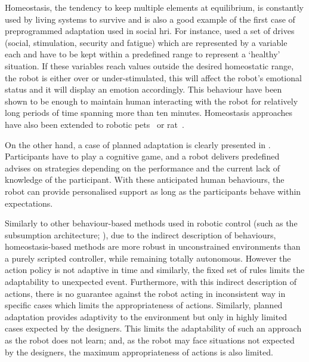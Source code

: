 	
	Homeostasis, the tendency to keep multiple elements at equilibrium, is constantly used by living systems to survive and is also a good example of the first case of preprogrammed adaptation used in social \gls{hri}. For instance, \citet{breazeal1998motivational} used a set of drives (social, stimulation, security and fatigue) which are represented by a variable each and have to be kept within a predefined range to represent a `healthy' situation. If these variables reach values outside the desired homeostatic range, the robot is either over or under-stimulated, this will affect the robot's emotional status and it will display an emotion accordingly. This behaviour have been shown to be enough to maintain human interacting with the robot for relatively long periods of time spanning more than ten minutes. Homeostasis approaches have also been extended to robotic pets~\citep{arkin2003ethological} or \gls{rat}~\citep{cao2017collaborative}.
	
	On the other hand, a case of planned adaptation is clearly presented in \citet{leyzberg2014personalizing}. Participants have to play a cognitive game,  and a robot delivers predefined advises on strategies depending on the performance and the current lack of knowledge of the participant. With these anticipated human behaviours, the robot can provide personalised support as long as the participants behave within expectations. 

	
	Similarly to other behaviour-based methods used in robotic control (such as the subsumption architecture; \citealt{brooks1986robust}), due to the indirect description of behaviours, homeostasis-based methods are more robust in unconstrained environments than a purely scripted controller, while remaining totally autonomous. However the action policy is not adaptive in time and similarly, the fixed set of rules limits the adaptability to unexpected event. Furthermore, with this indirect description of actions, there is no guarantee against the robot acting in inconsistent way in specific cases which limits the appropriateness of actions. Similarly, planned adaptation provides adaptivity to the environment but only in highly limited cases expected by the designers. This limits the adaptability of such an approach as the robot does not learn; and, as the robot may face situations not expected by the designers, the maximum appropriateness of actions is also limited.

